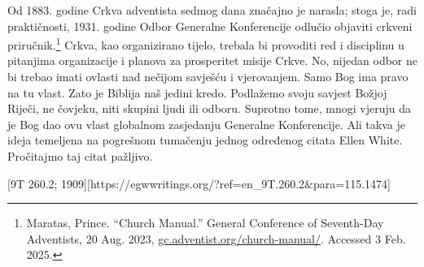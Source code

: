 Od 1883. godine Crkva adventista sedmog dana značajno je narasla; stoga je, radi praktičnosti, 1931. godine Odbor Generalne Konferencije odlučio objaviti crkveni priručnik.\footnote{Maratas, Prince. “Church Manual.” General Conference of Seventh-Day Adventists, 20 Aug. 2023, \href{https://gc.adventist.org/church-manual/}{gc.adventist.org/church-manual/}. Accessed 3 Feb. 2025.} Crkva, kao organizirano tijelo, trebala bi provoditi red i disciplinu u pitanjima organizacije i planova za prosperitet misije Crkve. No, nijedan odbor ne bi trebao imati ovlasti nad nečijom savješću i vjerovanjem. Samo Bog ima pravo na tu vlast. Zato je Biblija naš jedini kredo. Podlažemo svoju savjest Božjoj Riječi, ne čovjeku, niti skupini ljudi ili odboru. Suprotno tome, mnogi vjeruju da je Bog dao ovu vlast globalnom zasjedanju Generalne Konferencije. Ali takva je ideja temeljena na pogrešnom tumačenju jednog određenog citata Ellen White. Pročitajmo taj citat pažljivo.

[9T 260.2; 1909][https://egwwritings.org/?ref=en\_9T.260.2&para=115.1474]

